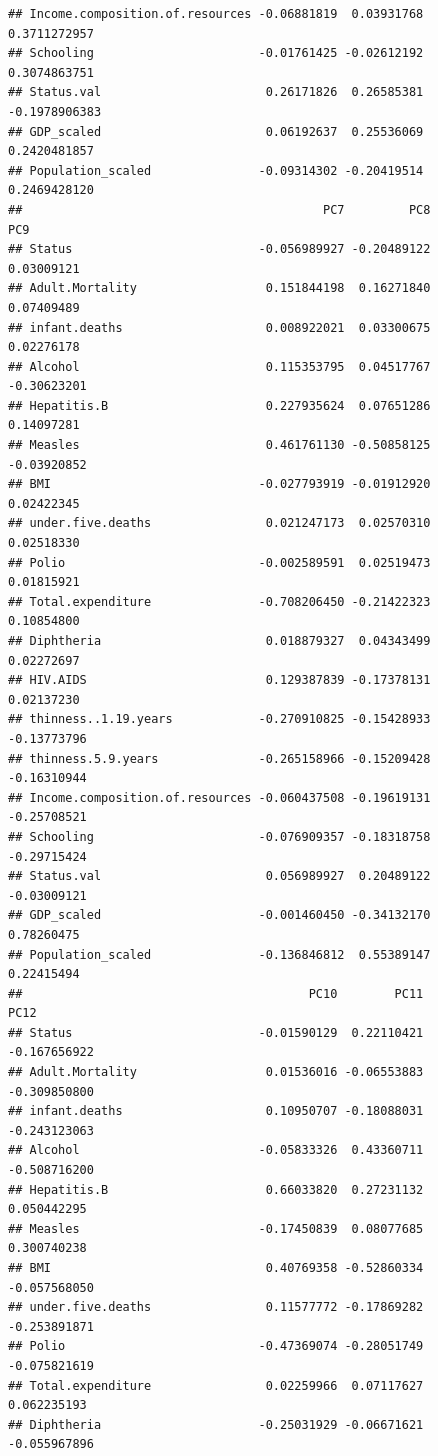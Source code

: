 \documentclass[
]{article}
\begin{document}
\begin{verbatim}
## Income.composition.of.resources -0.06881819  0.03931768  0.3711272957
## Schooling                       -0.01761425 -0.02612192  0.3074863751
## Status.val                       0.26171826  0.26585381 -0.1978906383
## GDP_scaled                       0.06192637  0.25536069  0.2420481857
## Population_scaled               -0.09314302 -0.20419514  0.2469428120
##                                          PC7         PC8         PC9
## Status                          -0.056989927 -0.20489122  0.03009121
## Adult.Mortality                  0.151844198  0.16271840  0.07409489
## infant.deaths                    0.008922021  0.03300675  0.02276178
## Alcohol                          0.115353795  0.04517767 -0.30623201
## Hepatitis.B                      0.227935624  0.07651286  0.14097281
## Measles                          0.461761130 -0.50858125 -0.03920852
## BMI                             -0.027793919 -0.01912920  0.02422345
## under.five.deaths                0.021247173  0.02570310  0.02518330
## Polio                           -0.002589591  0.02519473  0.01815921
## Total.expenditure               -0.708206450 -0.21422323  0.10854800
## Diphtheria                       0.018879327  0.04343499  0.02272697
## HIV.AIDS                         0.129387839 -0.17378131  0.02137230
## thinness..1.19.years            -0.270910825 -0.15428933 -0.13773796
## thinness.5.9.years              -0.265158966 -0.15209428 -0.16310944
## Income.composition.of.resources -0.060437508 -0.19619131 -0.25708521
## Schooling                       -0.076909357 -0.18318758 -0.29715424
## Status.val                       0.056989927  0.20489122 -0.03009121
## GDP_scaled                      -0.001460450 -0.34132170  0.78260475
## Population_scaled               -0.136846812  0.55389147  0.22415494
##                                        PC10        PC11         PC12
## Status                          -0.01590129  0.22110421 -0.167656922
## Adult.Mortality                  0.01536016 -0.06553883 -0.309850800
## infant.deaths                    0.10950707 -0.18088031 -0.243123063
## Alcohol                         -0.05833326  0.43360711 -0.508716200
## Hepatitis.B                      0.66033820  0.27231132  0.050442295
## Measles                         -0.17450839  0.08077685  0.300740238
## BMI                              0.40769358 -0.52860334 -0.057568050
## under.five.deaths                0.11577772 -0.17869282 -0.253891871
## Polio                           -0.47369074 -0.28051749 -0.075821619
## Total.expenditure                0.02259966  0.07117627  0.062235193
## Diphtheria                      -0.25031929 -0.06671621 -0.055967896

\end{verbatim}
\end{document}

